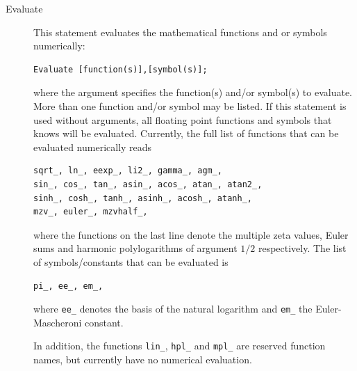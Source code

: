 \begin{description}
\item[Evaluate] This statement evaluates the mathematical functions and or symbols numerically:
\begin{verbatim}
Evaluate [function(s)],[symbol(s)];
\end{verbatim}
where the argument specifies the function(s) and/or symbol(s) to evaluate. 
More than one function and/or symbol may be listed. 
If this statement is used without arguments, all floating point functions and symbols that \FORM{} 
knows will be evaluated. Currently, the full list of functions that can be evaluated numerically reads 
\begin{verbatim}
sqrt_, ln_, eexp_, li2_, gamma_, agm_, 
sin_, cos_, tan_, asin_, acos_, atan_, atan2_, 
sinh_, cosh_, tanh_, asinh_, acosh_, atanh_,
mzv_, euler_, mzvhalf_,
\end{verbatim}
where the functions on the last line denote the multiple zeta values, Euler sums and 
harmonic polylogarithms of argument $1/2$ respectively.
The list of symbols/constants that can be evaluated is 
\begin{verbatim}
pi_, ee_, em_,
\end{verbatim}
where \texttt{ee\_} denotes the basis of the natural logarithm 
and \texttt{em\_} the Euler-Mascheroni constant.

In addition, the functions \texttt{lin\_}, \texttt{hpl\_} and \texttt{mpl\_} are reserved function names, 
but currently have no numerical evaluation.
\end{description}


